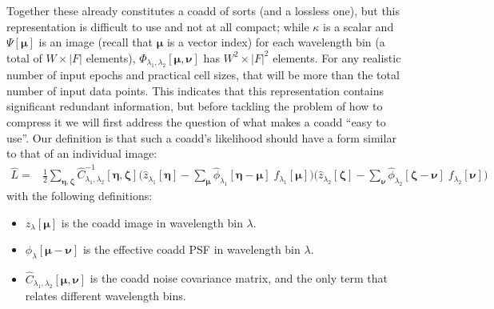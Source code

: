 \documentclass[DM,authoryear,toc]{lsstdoc}
\begin{document}
Together these already constitutes a coadd of sorts (and a lossless one), but this representation is difficult to use and not at all compact; while $\kappa$ is a scalar and $\Psi[\bm{\mu}]$ is an image (recall that $\bm{\mu}$ is a vector index) for each wavelength bin (a total of $W\times|F|$ elements), $\Phi_{\lambda_1,\lambda_2}[\bm{\mu},\bm{\nu}]$ has $W^2 \times |F|^2$ elements.
For any realistic number of input epochs and practical cell sizes, that will be more than the total number of input data points.
This indicates that this representation contains significant redundant information, but before tackling the problem of how to compress it we will first address the question of what makes a coadd ``easy to use''.
Our definition is that such a coadd's likelihood should have a form similar to that of an individual image:
\begin{align}
\hat{L} =&
    \frac{1}{2}\sum_{\bm{\eta},\bm{\zeta}}
    \hat{C}^{-1}_{\lambda_1,\lambda_2}[\bm{\eta},\bm{\zeta}]
    \bigg(
        \hat{z}_{\lambda_1}[\bm{\eta}]
        - \sum_{\bm{\mu}}\hat{\phi}_{\lambda_1}[\bm{\eta}-\bm{\mu}]
        \; f_{\lambda_1}[\bm{\mu}]
    \bigg)
    \bigg(
        \hat{z}_{\lambda_2}[\bm{\zeta}]
        - \sum_{\bm{\nu}}\hat{\phi}_{\lambda_2}[\bm{\zeta}-\bm{\nu}]
        \; f_{\lambda_2}[\bm{\nu}]
    \bigg)
    \label{eqn:natural-coadd-likelihood}
\end{align}
with the following definitions:
\begin{itemize}
    \item $z_{\lambda}[\bm{\mu}]$ is the coadd image in wavelength bin $\lambda$.
    \item $\phi_{\lambda}[\bm{\mu}-\bm{\nu}]$ is the effective coadd PSF in wavelength bin $\lambda$.
    \item $\hat{C}_{\lambda_1,\lambda_2}[\bm{\mu},\bm{\nu}]$ is the coadd noise covariance matrix, and the only term that relates different wavelength bins.
\end{itemize}
\end{document}
